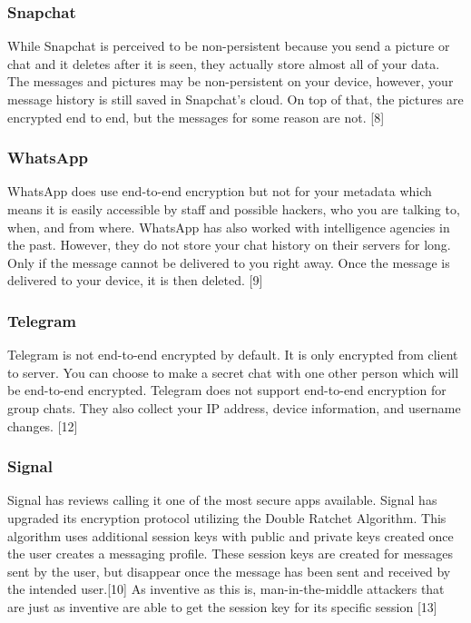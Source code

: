 \documentclass[12pt]{article}
\begin{document}
\subsubsection{Snapchat}
While Snapchat is perceived to be non-persistent because you send a picture or chat and it deletes after it is seen, they actually store almost all of your data. The messages and pictures may be non-persistent on your device, however, your message history is still saved in Snapchat’s cloud. On top of that, the pictures are encrypted end to end, but the messages for some reason are not. [8]

\subsubsection{WhatsApp}
WhatsApp does use end-to-end encryption but not for your metadata which means it is easily accessible by staff and possible hackers, who you are talking to, when, and from where. WhatsApp has also worked with intelligence agencies in the past. However, they do not store your chat history on their servers for long. Only if the message cannot be delivered to you right away. Once the message is delivered to your device, it is then deleted. [9]

\subsubsection{Telegram}
Telegram is not end-to-end encrypted by default. It is only encrypted from client to server. You can choose to make a secret chat with one other person which will be end-to-end encrypted. Telegram does not support end-to-end encryption for group chats. They also collect your IP address, device information, and username changes. [12]

\subsubsection{Signal}
Signal has reviews calling it one of the most secure apps available. Signal has upgraded its encryption protocol utilizing the Double Ratchet Algorithm. This algorithm uses additional session keys with public and private keys created once the user creates a messaging profile. These session keys are created for messages sent by the user, but disappear once the message has been sent and received by the intended user.[10] As inventive as this is, man-in-the-middle attackers that are just as inventive are able to get the session key for its specific session [13]
\end{document}
